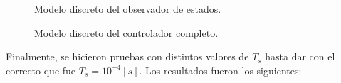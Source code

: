 \documentclass[a4paper, 10pt, onecolumn,journal]{ieeeconf}
\begin{document}
\begin{figure}[H]
	\centering
	\begin{adjustbox}{max width=\columnwidth}
	\end{adjustbox}
	\caption{Modelo discreto del observador de estados.}
	\label{Modelo discreto del observador de estados}
\end{figure}
\begin{figure}[H]
	\centering
	\begin{adjustbox}{max width=\columnwidth}
	\end{adjustbox}
	\caption{Modelo discreto del controlador completo.}
	\label{Modelo discreto del controlador completo}
\end{figure}
Finalmente, se hicieron pruebas con distintos valores de $T_s$ hasta dar con el correcto que fue $T_s = 10^{-4} [s]$. Los resultados fueron los siguientes:
\end{document}
